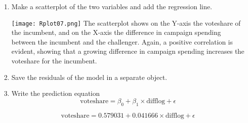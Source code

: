 \documentclass[12pt,letterpaper]{article}
\begin{document}
\begin{enumerate}
\vspace{5cm}
		\item Make a scatterplot of the two variables and add the regression line. 	
 
    \texttt{[image: Rplot07.png]}
The scatterplot shows on the Y-axis the voteshare of the incumbent, and on the X-axis the difference in campaign spending between the incumbent and the challenger. Again, a positive correlation is evident, showing that a growing difference in campaign spending increases the voteshare for the incumbent. 
		\item Save the residuals of the model in a separate object.	
 

		\item Write the prediction equation
\begin{equation}
\text{voteshare} = \beta_0 + \beta_1 \times \text{difflog} + \epsilon
\end{equation}

\begin{equation}
\text{voteshare} = 0.579031 + 0.041666 \times \text{difflog} + \epsilon
\end{equation}

	\end{enumerate}
	
\newpage
\end{document}
